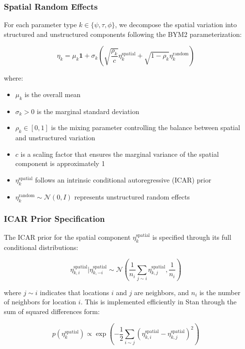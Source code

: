 \documentclass[
  letterpaper,
  DIV=11,
  numbers=noendperiod]{scrartcl}
\providecommand{\tightlist}{%
  \setlength{\itemsep}{0pt}\setlength{\parskip}{0pt}}\usepackage{longtable,booktabs,array}
\begin{document}
\subsubsection{Spatial Random Effects}\label{spatial-random-effects}

For each parameter type \(k \in \{\psi, \tau, \phi\}\), we decompose the
spatial variation into structured and unstructured components following
the BYM2 parameterization:

\[\eta_k = \mu_k\mathbf{1} + \sigma_k\left(\sqrt{\frac{\rho_k}{c}}\eta^{\text{spatial}}_k + \sqrt{1-\rho_k}\eta^{\text{random}}_k\right)\]

where:

\begin{itemize}
\tightlist
\item
  \(\mu_k\) is the overall mean
\item
  \(\sigma_k > 0\) is the marginal standard deviation
\item
  \(\rho_k \in [0,1]\) is the mixing parameter controlling the balance
  between spatial and unstructured variation
\item
  \(c\) is a scaling factor that ensures the marginal variance of the
  spatial component is approximately 1
\item
  \(\eta^{\text{spatial}}_k\) follows an intrinsic conditional
  autoregressive (ICAR) prior
\item
  \(\eta^{\text{random}}_k \sim \mathcal{N}(0, I)\) represents
  unstructured random effects
\end{itemize}

\subsubsection{ICAR Prior Specification}\label{icar-prior-specification}

The ICAR prior for the spatial component \(\eta^{\text{spatial}}_k\) is
specified through its full conditional distributions:

\[\eta^{\text{spatial}}_{k,i} | \eta^{\text{spatial}}_{k,-i} \sim \mathcal{N}\left(\frac{1}{n_i}\sum_{j \sim i} \eta^{\text{spatial}}_{k,j}, \frac{1}{n_i}\right)\]

where \(j \sim i\) indicates that locations \(i\) and \(j\) are
neighbors, and \(n_i\) is the number of neighbors for location \(i\).
This is implemented efficiently in Stan through the sum of squared
differences form:

\[p(\eta^{\text{spatial}}_k) \propto \exp\left(-\frac{1}{2}\sum_{i \sim j} (\eta^{\text{spatial}}_{k,i} - \eta^{\text{spatial}}_{k,j})^2\right)\]
\end{document}
